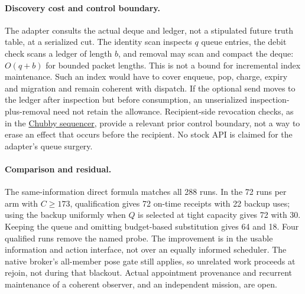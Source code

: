 \documentclass[11pt]{article}
\begin{document}
\paragraph{Discovery cost and control boundary.}
The adapter consults the actual deque and ledger, not a stipulated future
truth table, at a serialized cut. The identity scan inspects \(q\) queue
entries, the debit check scans a ledger of length \(b\), and removal may
scan and compact the deque: \(O(q+b)\) for bounded packet lengths. This is
not a bound for incremental index maintenance. Such an index would have to
cover enqueue, pop, charge, expiry and migration and remain coherent with
dispatch. If the optional send moves to the ledger after inspection but
before consumption, an unserialized inspection-plus-removal need not retain
the allowance. Recipient-side revocation checks, as in the
\href{https://www.usenix.org/legacy/event/osdi06/tech/full_papers/burrows/burrows.pdf}{Chubby sequencer},
provide a relevant prior control boundary, not a way to erase an effect
that occurs before the recipient. No stock API is claimed for the adapter's
queue surgery.

\paragraph{Comparison and residual.}
The same-information direct formula matches all 288 runs. In the 72 runs
per arm with \(C\ge173\), qualification gives 72 on-time receipts with 22
backup uses; using the backup uniformly when \(Q\) is selected at tight
capacity gives 72 with 30. Keeping the queue and omitting budget-based
substitution gives 64 and 18. Four qualified runs remove the named probe.
The improvement is in the usable information and action interface, not over
an equally informed scheduler. The native broker's all-member pose gate
still applies, so unrelated work proceeds at rejoin, not during that
blackout. Actual appointment provenance and recurrent maintenance of a
coherent observer, and an independent mission, are open.
\end{document}
